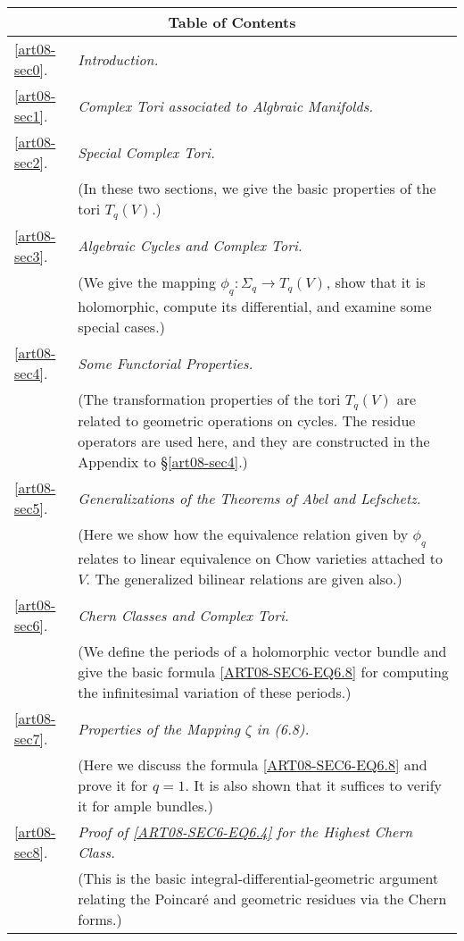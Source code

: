 \medskip
\begin{longtable}{lp{9cm}}
\multicolumn{2}{c}{\large\bf Table of Contents}\\[4pt]
\hline
\ref{art08-sec0}. & {\em Introduction.}\\[5pt]
\ref{art08-sec1}. & {\em Complex Tori associated to Algbraic Manifolds.}\\[5pt]
\ref{art08-sec2}. & {\em Special Complex Tori.}\\
                  & {(In these two sections, we give the basic properties of the tori $T_{q}(V)$.)}\\[5pt]
\ref{art08-sec3}. & {\em Algebraic Cycles and Complex Tori.}\\
                  & {(We give the mapping $\phi_{q}:\Sigma_{q}\to T_{q}(V)$, show that it is holomorphic, compute its differential, and examine some special cases.)}\\[5pt]
\ref{art08-sec4}. & {\em Some Functorial Properties.}\\
                  & {(The transformation properties of the tori $T_{q}(V)$ are related to geometric operations on cycles. The residue operators are used here, and they are constructed in the Appendix to \S\ref{art08-sec4}.)}\\[5pt]
\ref{art08-sec5}. & {\em Generalizations of the Theorems of Abel and Lefschetz.}\\
                  & (Here we show how the equivalence relation given by $\phi_{q}$ relates to linear equivalence on Chow varieties attached to $V$. The generalized bilinear relations are given also.)\\[5pt]
\ref{art08-sec6}. & {\em Chern Classes and Complex Tori.}\\
                  & (We define the periods of a holomorphic vector bundle and give the basic formula \eqref{ART08-SEC6-EQ6.8} for computing the infinitesimal variation of these periods.)\\[5pt]
\ref{art08-sec7}. & {\em Properties of the Mapping $\zeta$ in (6.8).}\\
                  & (Here we discuss the formula \eqref{ART08-SEC6-EQ6.8} and prove it for $q=1$. It is also shown that it suffices to verify it for ample bundles.)\\[5pt]
\ref{art08-sec8}. & {\em Proof of \eqref{ART08-SEC6-EQ6.4} for the Highest Chern Class.}\\
                  & (This is the basic integral-differential-geometric argument relating the Poincar\'e and geometric residues via the Chern forms.)\\[5pt]

\end{longtable}
